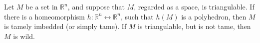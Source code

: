 Let $M$ be a set in $\mathbb{R}^n$, and suppose that $M$, regarded as a space, is triangulable. If there is a homeomorphism $h: \mathbb{R}^n \leftrightarrow \mathbb{R}^n$, such that $h(M)$ is a polyhedron, then $M$ is tamely imbedded (or simply tame). If $M$ is triangulable, but is not tame, then $M$ is wild.
